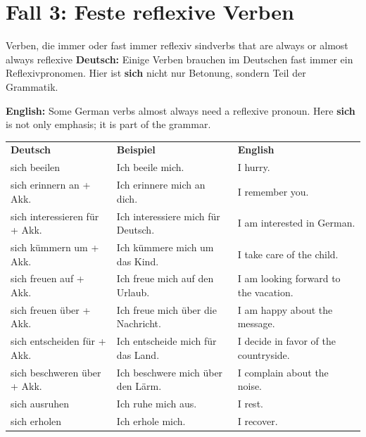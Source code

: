 \documentclass[a4paper,11pt]{article}
\newcommand{\GermanText}[1]{\textbf{Deutsch: }#1\par}
\newcommand{\EnglishText}[1]{{\small\color{SoftGray}\textbf{English: }#1\par}}
\newcommand{\HeaderCell}[1]{\cellcolor{HeaderBlueDark}\color{white}\bfseries #1}
\begin{document}
    
    \section{Fall 3: Feste reflexive Verben}
        
        \begin{grammarentry}{Verben, die immer oder fast immer reflexiv sind}{verbs that are always or almost always reflexive}
            \GermanText{Einige Verben brauchen im Deutschen fast immer ein Reflexivpronomen. Hier ist \textbf{sich} nicht nur Betonung, sondern Teil der Grammatik.}
            \EnglishText{Some German verbs almost always need a reflexive pronoun. Here \textbf{sich} is not only emphasis; it is part of the grammar.}
            
            \begin{longtable}{>{\raggedright\arraybackslash}p{}>{\raggedright\arraybackslash}p{}>{\raggedright\arraybackslash}p{}}
                \HeaderCell{Deutsch} & \HeaderCell{Beispiel} & \HeaderCell{English} \\
                sich beeilen & Ich beeile mich. & I hurry. \\
                sich erinnern an + Akk. & Ich erinnere mich an dich. & I remember you. \\
                sich interessieren für + Akk. & Ich interessiere mich für Deutsch. & I am interested in German. \\
                sich kümmern um + Akk. & Ich kümmere mich um das Kind. & I take care of the child. \\
                sich freuen auf + Akk. & Ich freue mich auf den Urlaub. & I am looking forward to the vacation. \\
                sich freuen über + Akk. & Ich freue mich über die Nachricht. & I am happy about the message. \\
                sich entscheiden für + Akk. & Ich entscheide mich für das Land. & I decide in favor of the countryside. \\
                sich beschweren über + Akk. & Ich beschwere mich über den Lärm. & I complain about the noise. \\
                sich ausruhen & Ich ruhe mich aus. & I rest. \\
                sich erholen & Ich erhole mich. & I recover. \\
            \end{longtable}
        \end{grammarentry}
    
\end{document}
